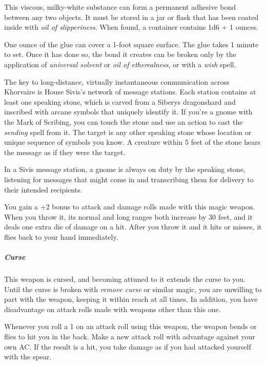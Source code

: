 \documentclass[10pt,a4paper,twoside,bg=print,twocolumn,openany,nodeprecatedcode]{dndbook}
\begin{document}
This viscous, milky-white substance can form a permanent adhesive bond between any two objects. It must be stored in a jar or flask that has been coated inside with \textit{oil of slipperiness}. When found, a container contains 1d6 + 1 ounces.

One ounce of the glue can cover a 1-foot square surface. The glue takes 1 minute to set. Once it has done so, the bond it creates can be broken only by the application of \textit{universal solvent} or \textit{oil of etherealness}, or with a \textit{wish} spell.

The key to long-distance, virtually instantaneous communication across Khorvaire is House Sivis's network of message stations. Each station contains at least one speaking stone, which is carved from a Siberys dragonshard and inscribed with arcane symbols that uniquely identify it. If you're a gnome with the Mark of Scribing, you can touch the stone and use an action to cast the \textit{sending} spell from it. The target is any other speaking stone whose location or unique sequence of symbols you know. A creature within 5 feet of the stone hears the message as if they were the target.

In a Sivis message station, a gnome is always on duty by the speaking stone, listening for messages that might come in and transcribing them for delivery to their intended recipients.

You gain a +2 bonus to attack and damage rolls made with this magic weapon. When you throw it, its normal and long ranges both increase by 30 feet, and it deals one extra die of damage on a hit. After you throw it and it hits or misses, it flies back to your hand immediately.

\subparagraph{Curse}
This weapon is cursed, and becoming attuned to it extends the curse to you. Until the curse is broken with \textit{remove curse} or similar magic, you are unwilling to part with the weapon, keeping it within reach at all times. In addition, you have disadvantage on attack rolls made with weapons other than this one.

Whenever you roll a 1 on an attack roll using this weapon, the weapon bends or flies to hit you in the back. Make a new attack roll with advantage against your own AC. If the result is a hit, you take damage as if you had attacked yourself with the spear.
\end{document}
